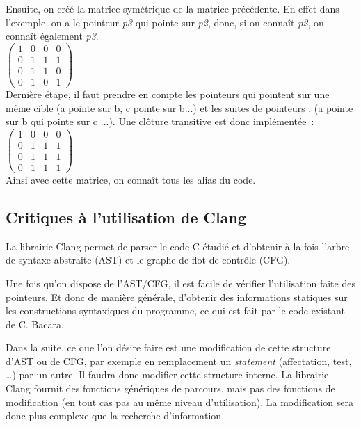 \documentclass[11pt]{article}
\begin{document}
\begin{itemize}
    Ensuite, on créé la matrice symétrique de la matrice précédente. En effet dans l'exemple, on a le pointeur \textit{p3} qui pointe sur \textit{p2},
    donc, si on connaît \textit{p2}, on connaît également \textit{p3}.\\
    
    \begin{math}
      \begin{pmatrix}
	1 & 0 & 0 & 0 \\
	0 & 1 & 1 & 1 \\
	0 & 1 & 1 & 0  \\
	0 & 1 & 0 & 1 
      \end{pmatrix}
     \end{math}
     \\
    
    Dernière étape, il faut prendre en compte les pointeurs qui pointent sur une même cible (a pointe sur b, c pointe sur b...)
    et les suites de pointeurs . (a pointe sur b qui pointe sur c
    ...). Une clôture transitive est donc implémentée~:\\
    
    \begin{math}
      \begin{pmatrix}
	1 & 0 & 0 & 0 \\
	0 & 1 & 1 & 1 \\
	0 & 1 & 1 & 1  \\
	0 & 1 & 1 & 1 
      \end{pmatrix}
     \end{math}
     \\
    
    Ainsi avec cette matrice, on connaît tous les alias du code.
    \end{itemize}
      
    
  \subsection{Critiques à l'utilisation de Clang}
    La librairie Clang permet de parser le code C étudié et d'obtenir
    à la fois l'arbre de syntaxe abstraite (AST) et le  graphe de flot
    de contrôle (CFG).

    Une fois qu'on dispose de l'AST/CFG, il est facile  de vérifier
    l'utilisation faite des pointeurs. Et donc de manière générale,
    d'obtenir des informations statiques sur les constructions
    syntaxiques du programme, ce qui est fait par le code existant de
    C. Bacara.

    Dans la suite, ce que l'on désire faire est une modification de
    cette structure d'AST ou de CFG, par exemple en remplacement un
    \emph{statement} (affectation, test, \ldots) par un autre. Il
    faudra donc modifier cette structure interne. La librairie Clang
    fournit des fonctions génériques de parcours, mais pas des
    fonctions de modification (en tout cas pas au même niveau
    d'utilisation). La modification sera donc plus complexe que la
    recherche d'information.
\end{document}
